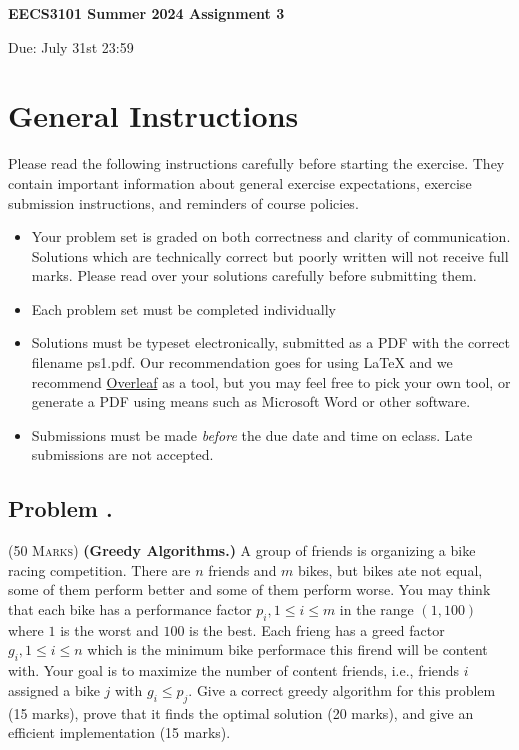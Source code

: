 \documentclass[12pt]{article}
\newcounter{ProblemNum}
\renewcommand{\theProblemNum}{\arabic{ProblemNum}}
\newcommand*{\anyproblem}[1]{\newpage\subsection*{#1}}
\newcommand*{\problem}[1]{\stepcounter{ProblemNum} %
\anyproblem{Problem \theProblemNum. \; #1}}
\begin{document}
\begin{center}
\begin{Large}
  \textbf{EECS3101 Summer 2024 Assignment 3 }\\
\end{Large}
\begin{large}
	Due: July 31st 23:59
\end{large}
\end{center}

\section*{General Instructions}
Please read the following instructions carefully before starting the exercise. They contain important
information about general exercise expectations, exercise submission instructions,
and reminders of course policies.

\begin{itemize}
\item Your problem set is graded on both correctness and clarity of communication. Solutions
which are technically correct but poorly written will not receive full marks. Please read over
your solutions carefully before submitting them.

\item Each problem set must be completed individually

\item Solutions must be typeset electronically, submitted as a PDF with the correct filename ps1.pdf. Our recommendation goes for using {\LaTeX}  and we recommend \href{https://www.overleaf.com/}{Overleaf} as a tool, but you may feel free to pick your own tool, or generate a PDF using means such as Microsoft Word or other software.


\item Submissions must be made \emph{before} the due date and time on eclass. Late submissions are not accepted.

\end{itemize}



\problem{}
\textsc{(50 Marks)} {\bf (Greedy Algorithms.)} A group of friends is organizing a bike racing competition. There are $n$ friends and $m$ bikes, but bikes ate not equal, some of them perform better and some of them perform worse. You may think that each bike has a performance factor $p_i, 1\le i\le m$ in the range $(1, 100)$ where $1$ is the worst and $100$ is the best. Each frieng has a greed factor $g_i, 1\le i\le n$ which is the minimum bike performace this firend will be content with. Your goal is to maximize the number of content friends, i.e., friends $i$ assigned a bike $j$ with $g_i\le p_j$. Give a correct greedy algorithm for this problem (15 marks), prove that it finds the optimal solution (20 marks), and give an efficient implementation (15 marks).
\end{document}
